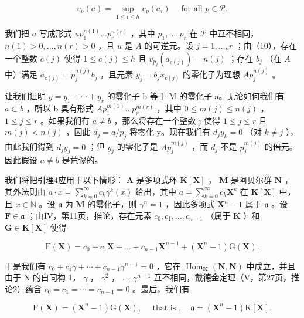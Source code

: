 \[
v _ {p} (a) = \sup _ {1 \leqslant i \leqslant h} v _ {p} (a _ {i}) \quad \text { for   all } p \in \mathscr {P}.\tag{10}
\]

我们把 \(a\) 写成形式 \(up_1^{n(1)} \ldots p_r^{n(r)}\) ，其中 \(p_1, \ldots, p_r\) 在 \(\mathcal{P}\) 中互不相同， \(n(1) > 0, \ldots, n(r) > 0\) ，且 \(u\) 是 \(A\) 的可逆元。设 \(j = 1, \ldots, r\) ；由（10），存在一个整数 \(c(j)\) 使得 \(1 \leqslant c(j) \leqslant h\) 且 \(v_{p_j}(a_{c(j)}) = n(j)\) ；存在 \(b_j\) （在 \(A\) 中）满足 \(a_{c(j)} = p_j^{n(j)}b_j\) ，且元素 \(y_j = b_jx_{c(j)}\) 的零化子为理想 \(Ap_j^{n(j)}\) 。

让我们证明 \(y = y_{1} + \cdots + y_{r}\) 的零化子 b 等于 M 的零化子 a。无论如何我们有 \(a \subset b\) ，所以 b 具有形式 \(Ap_{1}^{m(1)} \ldots p_{r}^{m(r)}\) ，其中 \(0 \leqslant m(j) \leqslant n(j)\) ， \(1 \leqslant j \leqslant r\) 。如果我们有 \(a \neq b\) ，那么将存在一个整数 j 使得 \(1 \leqslant j \leqslant r\) 且 \(m(j) < n(j)\) ，因此 \(d_{j} = a/p_{j}\) 将零化 y。现在我们有 \(d_{j}y_{k} = 0\) （对 \(k \neq j\) ），由此我们得到 \(d_{j}y_{j} = 0\) ；但 \(y_{j}\) 的零化子是 \(Ap_{j}^{m(j)}\) ，而 \(d_{j}\) 不是 \(p_{j}^{m(j)}\) 的倍元。因此假设 \(a \neq b\) 是荒谬的。

我们将把引理4应用于以下情形： \(\mathbf{A}\) 是多项式环 \(\mathbf{K}[\mathbf{X}]\) ， \(\mathbf{M}\) 是阿贝尔群 \(\mathbf{N}\) ，其外法则由 \(a \cdot x = \sum_{k=0}^{\infty} c_k \gamma^k(x)\) 给出，其中 \(a = \sum_{k=0}^{\infty} c_k \mathbf{X}^k\) 在 \(\mathbf{K}[\mathbf{X}]\) 中，且 \(x \in \mathbb{N}\) 。设 \(\mathfrak{a}\) 为 \(\mathbf{M}\) 的零化子，则 \(\gamma^n = 1\) ，因此多项式 \(\mathbf{X}^n - 1\) 属于 \(\mathfrak{a}\) 。设 \(\mathbf{F} \in \mathfrak{a}\) ；由IV，第11页，推论，存在元素 \(c_0, c_1, \ldots, c_{n-1}\) （属于 \(\mathbf{K}\) ）和 \(\mathbf{G} \in \mathbf{K}[\mathbf{X}]\) 使得

\[
\mathrm{F} (\mathbf {X}) = c _ {0} + c _ {1} \mathbf {X} + \dots + c _ {n - 1} \mathbf {X} ^ {n - 1} + (\mathbf {X} ^ {n} - 1) \mathrm{G} (\mathbf {X}).\tag{11}
\]

于是我们有 \(c_{0} + c_{1}\gamma + \cdots + c_{n-1}\gamma^{n-1} = 0\) ，它在 \(\operatorname{Hom}_{\mathbf{K}}(\mathbf{N}, \mathbf{N})\) 中成立，并且由于 N 的自同构 1， \(\gamma\) ， \(\gamma^{2}\) ， \ldots, \(\gamma^{n-1}\) 互不相同，戴德金定理（V，第27页，推论2）蕴含 \(c_{0} = c_{1} = \cdots = c_{n-1} = 0\) 。最后，我们有

\[
\mathrm{F} (\mathbf {X}) = \left(\mathbf {X} ^ {n} - 1\right) \mathrm{G} (\mathbf {X}), \quad \text { that   is }, \quad \mathfrak {a} = \left(\mathbf {X} ^ {n} - 1\right) \mathrm{K} [ \mathbf {X} ].
\]


